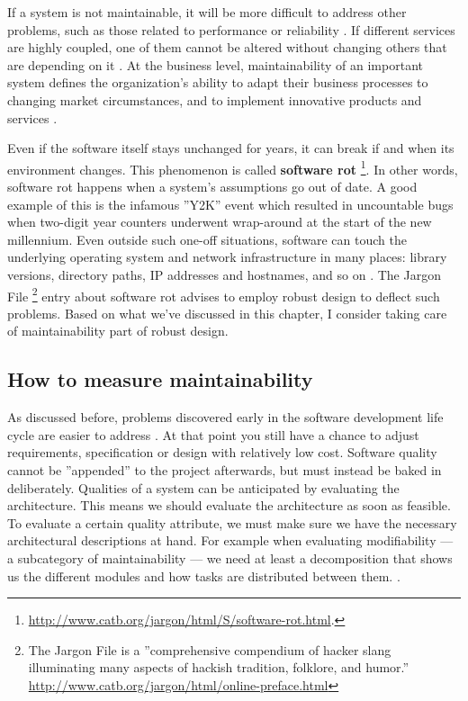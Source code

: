 \documentclass[utf8,english]{gradu3}
\begin{document}
If a system is not maintainable, it will be more difficult to address other
problems, such as those related to performance or reliability \parencite[46]{Bouwers2010}.
If different services are highly coupled, one of them cannot be altered without changing
others that are depending on it \parencite[2]{Vale2022}. At the business level,
maintainability of an important system defines the organization's ability to
adapt their business processes to changing market circumstances, and to
implement innovative products and services \parencite[21]{Broy2006}.

Even if the software itself stays unchanged for years, it can break if and when
its environment changes. This phenomenon is called \textbf{software rot}
\footnote{\url{http://www.catb.org/jargon/html/S/software-rot.html}.}. In other
words, software rot happens when a system's assumptions go out of date. A good
example of this is the infamous ''Y2K'' event which resulted in uncountable bugs
when two-digit year counters underwent wrap-around at the start of the new
millennium. Even outside such one-off situations, software can touch the
underlying operating system and network infrastructure in many places: library
versions, directory paths, IP addresses and hostnames, and so on
\parencite{Heroku2011}. The Jargon File \footnote{The Jargon File is a
  ''comprehensive compendium of hacker slang illuminating many aspects of hackish
  tradition, folklore, and humor.''
  \url{http://www.catb.org/jargon/html/online-preface.html}} entry about software
rot advises to employ robust design to deflect such problems. Based on what
we've discussed in this chapter, I consider taking care of maintainability part
of robust design.


\subsection{How to measure maintainability}

As discussed before, problems discovered early in the software development life
cycle are easier to address \parencite{Bass1998}. At that point you still have a
chance to adjust requirements, specification or design with relatively low cost.
Software quality cannot be ''appended'' to the project afterwards, but must
instead be baked in deliberately. Qualities of a system can be anticipated by
evaluating the architecture. This means we should evaluate the architecture as
soon as feasible. To evaluate a certain quality attribute, we must make sure we
have the necessary architectural descriptions at hand. For example when
evaluating modifiability --- a subcategory of maintainability --- we need at
least a decomposition that shows us the different modules and how tasks are
distributed between them. \parencite[32, 190-191]{Bass1998}.
\end{document}

